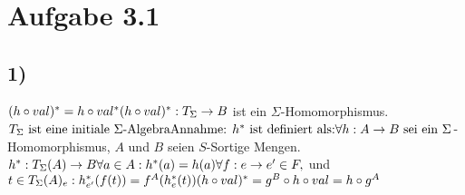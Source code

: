 \section*{Aufgabe 3.1}
\subsection*{1)}
$(h \circ val)^* = h \circ val^*\\
\\
(h \circ val)^* : T_{\Sigma} \rightarrow B $ ist ein $\Sigma$-Homomorphismus.$\\
T_\Sigma \text{ ist eine initiale }\Sigma\text{-Algebra}\\
\\
\text{Annahme: } h^* \text{ ist definiert als:}\\
\forall h : A \rightarrow B \text{ sei ein } \Sigma$-Homomorphismus, $A$ und $B$ seien $S$-Sortige Mengen.$\\
h^* : T_\Sigma(A) \rightarrow B\\
\forall a\in A: h^*(a) = h(a)\\
\forall f: e \rightarrow e' \in F, $ und $ t \in T_\Sigma(A)_e: h_{e'}^*(f(t)) = f^A(h_e^*(t))\\
\\
(h \circ val)^* = g^B \circ h \circ val = h \circ g^A$ 

